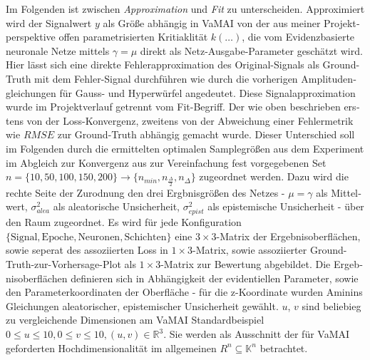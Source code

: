 \begin{otherlanguage}{ngerman}
\vspace{0.125\baselineskip}
\noindent

Im Folgenden ist zwischen \textit{Approximation} und \textit{Fit} zu unterscheiden. Approximiert wird der Signalwert $y$ als Größe abhängig in VaMAI von der aus meiner Projektperspektive offen parametrisierten Kritiaklität $k(\dots)$, die vom \gls{Evidenzbasierte neuronale Netze} mittels $\gamma = \mu$ direkt als Netz-Ausgabe-Parameter geschätzt wird. Hier lässt sich eine direkte Fehlerapproximation des Original-Signals als Ground-Truth mit dem Fehler-Signal durchführen wie durch die vorherigen Amplitudengleichungen für Gauss- und Hyperwürfel angedeutet. Diese Signalapproximation wurde im Projektverlauf getrennt vom Fit-Begriff. Der wie oben beschrieben erstens von der Loss-Konvergenz, zweitens von der Abweichung einer Fehlermetrik wie $\textit{RMSE}$ zur Ground-Truth abhängig gemacht wurde. Dieser Unterschied soll im Folgenden durch die ermittelten optimalen Samplegrößen aus dem Experiment im Abgleich zur Konvergenz aus zur Vereinfachung fest vorgegebenen Set $n = \{ 10, 50, 100, 150, 200 \} \rightarrow \{ n_{min}, n_{\frac{\Delta}{2}}, n_{\Delta} \}$ zugeordnet werden. Dazu wird die rechte Seite der Zurodnung den drei Ergbnisgrößen des Netzes - $\mu = \gamma$ als Mittelwert, $\sigma^{2}_{alea}$ als aleatorische Unsicherheit, $\sigma^{2}_{epist}$ als epistemische Unsicherheit - über den Raum zugeordnet. Es wird für jede Konfiguration $\{\text{Signal},\text{Epoche},\text{Neuronen},\text{Schichten} \}$ eine $3\times3$-Matrix der Ergebnisoberflächen, sowie seperat des assoziierten Loss in $1\times3$-Matrix, sowie assoziierter Ground-Truth-zur-Vorhersage-Plot als $1\times3$-Matrix zur Bewertung abgebildet. Die Ergebnisoberflächen definieren sich in Abhängigkeit der evidentiellen Parameter, sowie den Parameterkoordinaten der Oberfläche - für die z-Koordinate wurden Aminins Gleichungen aleatorischer, epistemischer Unsicherheit gewählt. $u$, $v$ sind beliebieg zu vergleichende Dimensionen am VaMAI Standardbeispiel $0 \leq u \leq 10, 0 \leq v \leq 10, (u,v) \in \mathbb{R}^3$. Sie werden als Ausschnitt der für VaMAI geforderten Hochdimensionalität im allgemeinen $R^{n} \subseteq \mathbb{K}^{n}$ betrachtet.


\end{otherlanguage}
